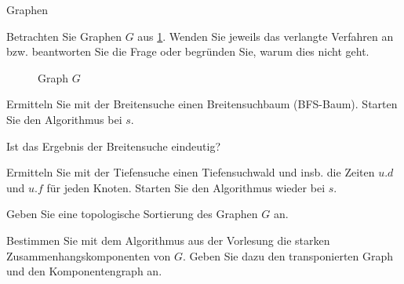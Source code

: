 \documentclass{exercisesheet}
\begin{document}
\begin{eexercises}{Graphen}{
    Betrachten Sie Graphen $G$ aus \ref{fig:simplegraph}. Wenden Sie jeweils das verlangte Verfahren an bzw. beantworten Sie die Frage oder begründen Sie, warum dies nicht geht.
    \begin{figure}[ht]
      \centering

      \caption{Graph $G$}\label{fig:simplegraph}
    \end{figure}
  }
  \item Ermitteln Sie mit der Breitensuche einen Breitensuchbaum (BFS-Baum). Starten Sie den Algorithmus bei $s$.
  \item Ist das Ergebnis der Breitensuche eindeutig?
  \item Ermitteln Sie mit der Tiefensuche einen Tiefensuchwald und insb. die Zeiten $u.d$ und $u.f$ für jeden Knoten. Starten Sie den Algorithmus wieder bei $s$.
  \item Geben Sie eine topologische Sortierung des Graphen $G$ an.
  \item Bestimmen Sie mit dem Algorithmus aus der Vorlesung die starken Zusammenhangskomponenten von $G$. Geben Sie dazu den transponierten Graph und den Komponentengraph an.
\end{eexercises}
\end{document}
